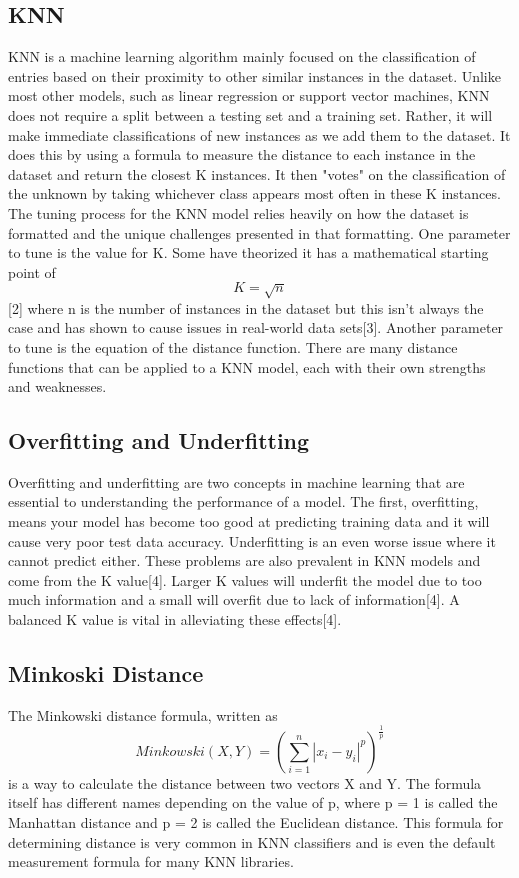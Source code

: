 \documentclass[confrence]{IEEEtran}
\begin{document}
\subsection*{KNN}
KNN is a machine learning algorithm mainly focused on the classification of entries based on their proximity to other similar instances in the dataset.
Unlike most other models, such as linear regression or support vector machines, KNN does not require a split between a testing set and a training set.
Rather, it will make immediate classifications of new instances as we add them to the dataset.
It does this by using a formula to measure the distance to each instance in the dataset and return the closest K instances. It then "votes" on the classification of the unknown by taking whichever class appears most often in these K instances.
The tuning process for the KNN model relies heavily on how the dataset is formatted and the unique challenges presented in that formatting.
One parameter to tune is the value for K.
Some have theorized it has a mathematical starting point of \[K = \sqrt{n}\][2] where n is the number of instances in the dataset but this isn't always the case and has shown to cause issues in real-world data sets[3].
Another parameter to tune is the equation of the distance function.
There are many distance functions that can be applied to a KNN model, each with their own strengths and weaknesses.
\subsection*{Overfitting and Underfitting}
Overfitting and underfitting are two concepts in machine learning that are essential to understanding the performance of a model.
The first, overfitting, means your model has become too good at predicting training data and it will cause very poor test data accuracy.
Underfitting is an even worse issue where it cannot predict either. These problems are also prevalent in KNN models and come from the K value[4].
Larger K values will underfit the model due to too much information and a small will overfit due to lack of information[4].
A balanced K value is vital in alleviating these effects[4].
\subsection*{Minkoski Distance}
The Minkowski distance formula, written as \[ Minkowski(X,Y) = (\sum_{i=1}^n|x_i-y_i|^p)^\frac{1}{p}\] is a way to calculate the distance between two vectors X and Y.
The formula itself has different names depending on the value of p, where p = 1 is called the Manhattan distance and p = 2 is called the Euclidean distance.
This formula for determining distance is very common in KNN classifiers and is even the default measurement formula for many KNN libraries.
\end{document}
